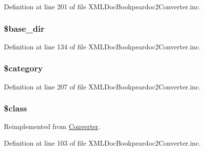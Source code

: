\-Definition at line 201 of file \-X\-M\-L\-Doc\-Bookpeardoc2\-Converter.\-inc.

\hypertarget{class_x_m_l_doc_bookpeardoc2_converter_aa36f57c62963507498e1181f9a75bbb9}{
\subsubsection[{\$base\-\_\-dir}]{\setlength{\rightskip}{0pt plus 5cm}\$base\-\_\-dir}}\label{class_x_m_l_doc_bookpeardoc2_converter_aa36f57c62963507498e1181f9a75bbb9}


\-Definition at line 134 of file \-X\-M\-L\-Doc\-Bookpeardoc2\-Converter.\-inc.

\hypertarget{class_x_m_l_doc_bookpeardoc2_converter_a18b2a8d133fa7733bf34abcc6ca2ef5b}{
\subsubsection[{\$category}]{\setlength{\rightskip}{0pt plus 5cm}\$category}}\label{class_x_m_l_doc_bookpeardoc2_converter_a18b2a8d133fa7733bf34abcc6ca2ef5b}


\-Definition at line 207 of file \-X\-M\-L\-Doc\-Bookpeardoc2\-Converter.\-inc.

\hypertarget{class_x_m_l_doc_bookpeardoc2_converter_a252ba022809910ea710a068fc1bab657}{
\subsubsection[{\$class}]{\setlength{\rightskip}{0pt plus 5cm}\$class}}\label{class_x_m_l_doc_bookpeardoc2_converter_a252ba022809910ea710a068fc1bab657}


\-Reimplemented from \hyperlink{class_converter_a252ba022809910ea710a068fc1bab657}{\-Converter}.



\-Definition at line 103 of file \-X\-M\-L\-Doc\-Bookpeardoc2\-Converter.\-inc.

